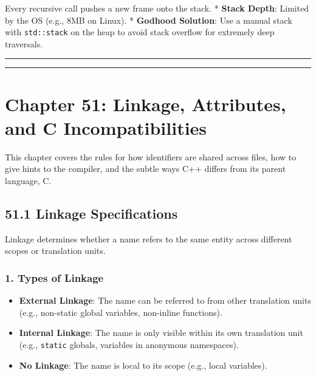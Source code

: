 Every recursive call pushes a new frame onto the stack. * \textbf{Stack
Depth}: Limited by the OS (e.g., 8MB on Linux). * \textbf{Godhood
Solution}: Use a manual stack with \passthrough{\lstinline!std::stack!}
on the heap to avoid stack overflow for extremely deep traversals.

\begin{center}\rule{0.5\linewidth}{0.5pt}\end{center}

\begin{center}\rule{0.5\linewidth}{0.5pt}\end{center}

\hypertarget{chapter-51-linkage-attributes-and-c-incompatibilities}{%
\chapter{Chapter 51: Linkage, Attributes, and C
Incompatibilities}\label{chapter-51-linkage-attributes-and-c-incompatibilities}}

This chapter covers the rules for how identifiers are shared across
files, how to give hints to the compiler, and the subtle ways C++
differs from its parent language, C.

\hypertarget{linkage-specifications}{%
\section{51.1 Linkage Specifications}\label{linkage-specifications}}

Linkage determines whether a name refers to the same entity across
different scopes or translation units.

\hypertarget{types-of-linkage}{%
\subsection{1. Types of Linkage}\label{types-of-linkage}}

\begin{itemize}
\tightlist
\item
  \textbf{External Linkage}: The name can be referred to from other
  translation units (e.g., non-static global variables, non-inline
  functions).
\item
  \textbf{Internal Linkage}: The name is only visible within its own
  translation unit (e.g., \passthrough{\lstinline!static!} globals,
  variables in anonymous namespaces).
\item
  \textbf{No Linkage}: The name is local to its scope (e.g., local
  variables).
\end{itemize}

